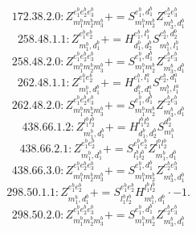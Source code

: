 \documentclass[letterpaper,10pt,fleqn,leqno,onecolumn]{article}
\begin{document}
\begin{equation} \;\;\;\;\;\;  172.38.2.0: Z^{e_{1}^{b}e_{2}^{b}e_{3}^{b}}_{m_{1}^{b}m_{2}^{b}m_{3}^{b}}+=S^{e_{1}^{b},d_{1}^{b}}_{m_{1}^{b}m_{2}^{b}}Z^{e_{2}^{b}e_{3}^{b}}_{m_{3}^{b},d_{1}^{b}} \end{equation}
\begin{equation} \;\;\;\;\;\;  258.48.1.1: Z^{e_{1}^{b}e_{2}^{b}}_{m_{1}^{b},d_{1}^{b}}+=H^{e_{1}^{b},l_{1}^{b}}_{d_{1}^{b},d_{2}^{b}}S^{e_{2}^{b},d_{2}^{b}}_{m_{1}^{b},l_{1}^{b}} \end{equation}
\begin{equation} \;\;\;\;\;\;  258.48.2.0: Z^{e_{1}^{b}e_{2}^{b}e_{3}^{b}}_{m_{1}^{b}m_{2}^{b}m_{3}^{b}}+=S^{e_{1}^{b},d_{1}^{b}}_{m_{1}^{b}m_{2}^{b}}Z^{e_{2}^{b}e_{3}^{b}}_{m_{3}^{b},d_{1}^{b}} \end{equation}
\begin{equation} \;\;\;\;\;\;  262.48.1.1: Z^{e_{1}^{b}e_{2}^{b}}_{m_{1}^{b},d_{1}^{b}}+=H^{e_{1}^{b},l_{1}^{a}}_{d_{1}^{b},d_{1}^{a}}S^{e_{2}^{b},d_{1}^{a}}_{m_{1}^{b},l_{1}^{a}} \end{equation}
\begin{equation} \;\;\;\;\;\;  262.48.2.0: Z^{e_{1}^{b}e_{2}^{b}e_{3}^{b}}_{m_{1}^{b}m_{2}^{b}m_{3}^{b}}+=S^{e_{1}^{b},d_{1}^{b}}_{m_{1}^{b}m_{2}^{b}}Z^{e_{2}^{b}e_{3}^{b}}_{m_{3}^{b},d_{1}^{b}} \end{equation}
\begin{equation} \;\;\;\;\;\;  438.66.1.2: Z^{l_{1}^{b}l_{2}^{b}}_{m_{1}^{b},d_{1}^{b}}+=H^{l_{1}^{b}l_{2}^{b}}_{d_{1}^{b},d_{2}^{b}}S^{d_{2}^{b}}_{m_{1}^{b}} \end{equation}
\begin{equation} \;\;\;\;\;\;  438.66.2.1: Z^{e_{1}^{b}e_{2}^{b}}_{m_{1}^{b},d_{1}^{b}}+=S^{e_{1}^{b}e_{2}^{b}}_{l_{1}^{b}l_{2}^{b}}Z^{l_{1}^{b}l_{2}^{b}}_{m_{1}^{b},d_{1}^{b}} \end{equation}
\begin{equation} \;\;\;\;\;\;  438.66.3.0: Z^{e_{1}^{b}e_{2}^{b}e_{3}^{b}}_{m_{1}^{b}m_{2}^{b}m_{3}^{b}}+=S^{e_{1}^{b},d_{1}^{b}}_{m_{1}^{b}m_{2}^{b}}Z^{e_{2}^{b}e_{3}^{b}}_{m_{3}^{b},d_{1}^{b}} \end{equation}
\begin{equation} \;\;\;\;\;\;  298.50.1.1: Z^{e_{1}^{b}e_{2}^{b}}_{m_{1}^{b},d_{1}^{b}}+=S^{e_{1}^{b}e_{2}^{b}}_{l_{1}^{b}l_{2}^{b}}H^{l_{1}^{b}l_{2}^{b}}_{m_{1}^{b},d_{1}^{b}}\cdot -1. \end{equation}
\begin{equation} \;\;\;\;\;\;  298.50.2.0: Z^{e_{1}^{b}e_{2}^{b}e_{3}^{b}}_{m_{1}^{b}m_{2}^{b}m_{3}^{b}}+=S^{e_{1}^{b},d_{1}^{b}}_{m_{1}^{b}m_{2}^{b}}Z^{e_{2}^{b}e_{3}^{b}}_{m_{3}^{b},d_{1}^{b}} \end{equation}
\end{document}
